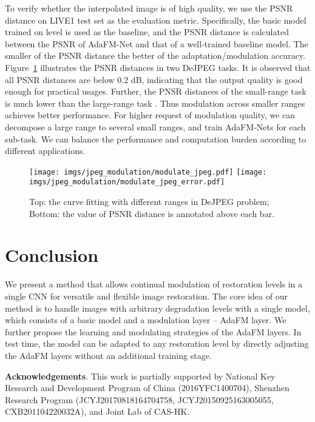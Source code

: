\documentclass[10pt,twocolumn,letterpaper]{article}
\begin{document}
To verify whether the interpolated image is of high quality, we use the PSNR distance on LIVE1 test set as the evaluation metric. Specifically, the basic model trained on level  is used as the baseline, and the PSNR distance is calculated between the PSNR of AdaFM-Net and that of a well-trained baseline model. The smaller of the PSNR distance the better of the adaptation/modulation accuracy. Figure~\ref{fig:modulation} illustrates the PSNR distances in two DeJPEG tasks. It is observed that all PSNR distances are below 0.2 dB, indicating that the output quality is good enough for practical usages. Further, the PNSR distances of the small-range task  is much lower than the large-range task . Thus modulation across smaller ranges achieves better performance. For higher request of modulation quality, we can decompose a large range to several small ranges, and train AdaFM-Nets for each sub-task. We can balance the performance and computation burden according to different applications.
\begin{figure}[h]
	\vspace{-1em}
\centering
	\texttt{[image: imgs/jpeg\_modulation/modulate\_jpeg.pdf]}
	\texttt{[image: imgs/jpeg\_modulation/modulate\_jpeg\_error.pdf]}
\vspace{-1em}
	\caption{Top: the curve fitting with different ranges in DeJPEG problem; Bottom: the value of PSNR distance is annotated above each bar.}
	\label{fig:modulation}
	\vspace{-2em}
\end{figure}

\section{Conclusion}
We present a method that allows continual modulation of restoration levels in a single CNN for versatile and flexible image restoration. 
The core idea of our method is to handle images with arbitrary degradation levels with a single model, which consists of a basic model and a modulation layer -- AdaFM layer. We further propose the learning and modulating strategies of the AdaFM layers. In test time, the model can be adapted to any restoration level by directly adjusting the AdaFM layers without an additional training stage.

\textbf{Acknowledgements}. 
This work is partially supported by National Key Research and Development Program of China (2016YFC1400704), Shenzhen Research Program (JCYJ20170818164704758, JCYJ20150925163005055, CXB201104220032A), and Joint Lab of CAS-HK.
\end{document}
